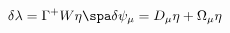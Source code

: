 \begin{equation}
\label{susyvar}
\delta \lambda = \Gamma^+ W \eta
\spa
\delta \psi_\mu = D_\mu \eta + \Omega_\mu \eta
\end{equation}

